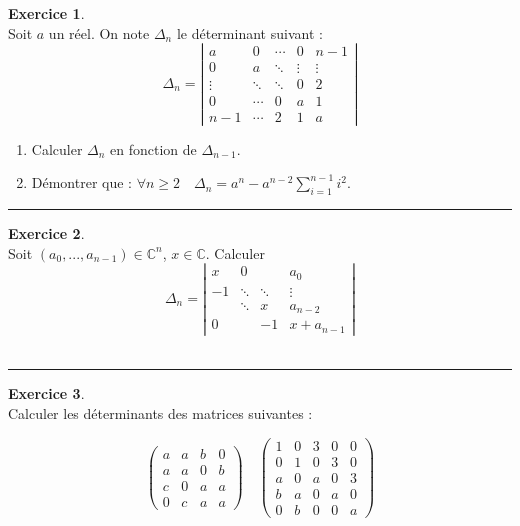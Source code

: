 \documentclass[a4paper,10pt]{article}
\theoremstyle{definition}
\theoremstyle{definition}
\newtheorem{exo}{Exercice}
\newcommand{\C}{\mathbb{C}}
\begin{document}
\begin{minipage}{1\linewidth}
\begin{minipage}[t]{0.48\linewidth}
	
			\begin{exo}\quad\\
		Soit $a$ un réel.
		On note $\Delta_n$ le déterminant suivant : 
		$$
		\Delta_n = 
		\left\vert
		\begin{matrix}
		a   &    0   & \cdots & 0      & n-1 \\
		0   &    a   & \ddots & \vdots & \vdots \\
		\vdots & \ddots & \ddots & 0      & 2 \\
		0   & \cdots &   0    & a      & 1 \\
		n-1  & \cdots &   2    & 1      & a
		\end{matrix}
		\right\vert
		$$
		\begin{enumerate}
			\item Calculer $\Delta_n$ en fonction de $\Delta_{n-1}$.
			\item Démontrer que : $\displaystyle \forall n\geq2\quad
			\Delta_n=a^n-a^{n-2}\sum_{i=1}^{n-1}{i^2}$.
		\end{enumerate}
		
		\centering
		\rule{1\linewidth}{0.6pt}
	\end{exo}

		
		
		
	\end{minipage}	
	\hfill\vrule\hfill
	\begin{minipage}[t]{0.48\linewidth}
		\raggedright
		
				\begin{exo}\quad\\[0.25cm]
			Soit $(a_{0},...,a_{n-1})\in\C^{n}$, $x\in\C$. Calculer
			$$
			\Delta_{n}=
			\left|
			\begin{matrix}
			x &  0    &        & a_{0}   \\
			-1 &\ddots &\ddots  &\vdots  \\
			&\ddots &x      & a_{n-2} \\
			0 &       & -1      & x+a_{n-1}
			\end{matrix}
			\right|
			$$
			\hfill\\[0.25cm]
			\centering
			\rule{1\linewidth}{0.6pt}
		\end{exo}
		

		
		\begin{exo}\quad\\
		Calculer les déterminants des matrices suivantes :
		
		$$
		\begin{pmatrix}
		a&a&b&0 \\  a&a&0&b \\  c&0&a&a \\ 0&c&a&a
		\end{pmatrix}
		\quad
		\begin{pmatrix}
		1&0&3&0&0 \\ 0&1&0&3&0 \\ a&0&a&0&3 \\ b&a&0&a&0 \\ 0&b&0&0&a  
		\end{pmatrix}
		$$
		\hfill\\[0.25cm]
			

\end{exo}
\end{minipage}
\end{minipage}
\end{document}
